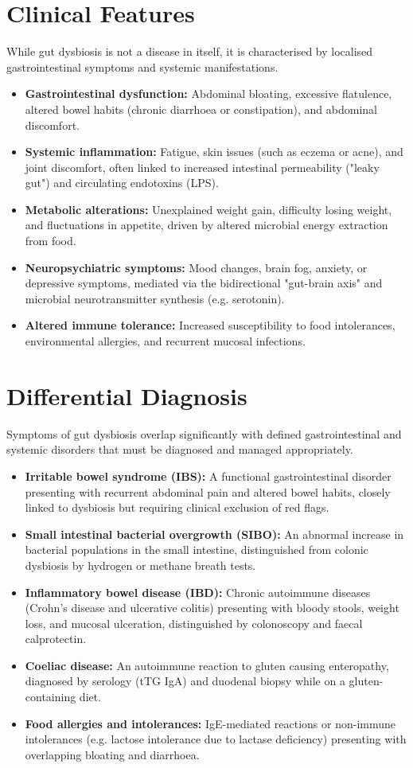 \section*{Clinical Features}
While gut dysbiosis is not a disease in itself, it is characterised by localised gastrointestinal symptoms and systemic manifestations.
\begin{itemize}
    \item \textbf{Gastrointestinal dysfunction:} Abdominal bloating, excessive flatulence, altered bowel habits (chronic diarrhoea or constipation), and abdominal discomfort.
    \item \textbf{Systemic inflammation:} Fatigue, skin issues (such as eczema or acne), and joint discomfort, often linked to increased intestinal permeability ("leaky gut") and circulating endotoxins (LPS).
    \item \textbf{Metabolic alterations:} Unexplained weight gain, difficulty losing weight, and fluctuations in appetite, driven by altered microbial energy extraction from food.
    \item \textbf{Neuropsychiatric symptoms:} Mood changes, brain fog, anxiety, or depressive symptoms, mediated via the bidirectional "gut-brain axis" and microbial neurotransmitter synthesis (e.g. serotonin).
    \item \textbf{Altered immune tolerance:} Increased susceptibility to food intolerances, environmental allergies, and recurrent mucosal infections.
\end{itemize}

\section*{Differential Diagnosis}
Symptoms of gut dysbiosis overlap significantly with defined gastrointestinal and systemic disorders that must be diagnosed and managed appropriately.
\begin{itemize}
    \item \textbf{Irritable bowel syndrome (IBS):} A functional gastrointestinal disorder presenting with recurrent abdominal pain and altered bowel habits, closely linked to dysbiosis but requiring clinical exclusion of red flags.
    \item \textbf{Small intestinal bacterial overgrowth (SIBO):} An abnormal increase in bacterial populations in the small intestine, distinguished from colonic dysbiosis by hydrogen or methane breath tests.
    \item \textbf{Inflammatory bowel disease (IBD):} Chronic autoimmune diseases (Crohn's disease and ulcerative colitis) presenting with bloody stools, weight loss, and mucosal ulceration, distinguished by colonoscopy and faecal calprotectin.
    \item \textbf{Coeliac disease:} An autoimmune reaction to gluten causing enteropathy, diagnosed by serology (tTG IgA) and duodenal biopsy while on a gluten-containing diet.
    \item \textbf{Food allergies and intolerances:} IgE-mediated reactions or non-immune intolerances (e.g. lactose intolerance due to lactase deficiency) presenting with overlapping bloating and diarrhoea.
\end{itemize}

